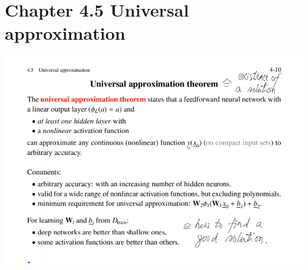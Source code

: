   \section{Chapter 4.5 Universal approximation } 
\includegraphics[width=\linewidth]{Images/Slide410.png}

